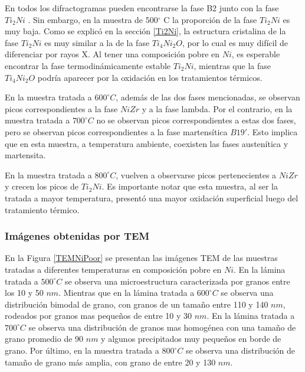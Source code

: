 \documentclass[12pt]{article}
\theoremstyle{definition}
\theoremstyle{remark}
\begin{document}
{En todos los difractogramas pueden encontrarse la fase B2 junto con la fase $Ti_2Ni$ . Sin embargo, en la muestra de 500$^\circ$ C la proporción de la fase $Ti_2 Ni$ es muy baja. Como se explicó en la sección \ref{Ti2Ni}, la estructura cristalina de la fase $Ti_2 Ni$ es muy similar a la de la fase $Ti_4Ni_2O$, por lo cual es muy difícil de diferenciar por rayos X. Al tener una composición pobre en $Ni$, es esperable encontrar la fase termodinámicamente estable $Ti_2 Ni$, mientras que la fase $Ti_4Ni_2O$ podría aparecer por la oxidación en los tratamientos térmicos.

En la muestra tratada a $600 ^\circ C$, además de las dos fases mencionadas, se observan picos correspondientes a la fase $NiZr$ y a la fase lambda. Por el contrario, en la muestra tratada a $700 ^\circ C$ no se observan picos correspondientes a estas dos fases, pero se observan picos correspondientes a la fase martensítica $B19'$. Esto implica que en esta muestra, a temperatura ambiente, coexisten las fases austenítica y martensita.

En la muestra tratada a $800 ^\circ C$, vuelven a observarse picos pertenecientes a $NiZr$ y crecen los picos de $Ti_2 Ni$. Es importante notar que esta muestra, al ser la tratada a mayor temperatura, presentó una mayor oxidación superficial luego del tratamiento térmico. 


\subsubsection{Imágenes obtenidas por TEM}
\label{TemNiPoorResults}

En la Figura \ref{TEMNiPoor} se presentan las imágenes TEM de las muestras tratadas a diferentes temperaturas en composición pobre en $Ni$. En la lámina tratada a $500 ^\circ C$ se observa una microestructura caracterizada por granos entre los 10 y 50 $nm$. Mientras que en la lámina tratada a $600 ^\circ C$ se observa una distribución bimodal de grano, con granos de un tamaño entre 110 y 140 $nm$, rodeados por granos mas pequeños de entre 10 y 30 $nm$. En la lámina tratada a $700 ^\circ C$ se observa una distribución de granos mas homogénea con una tamaño de grano promedio de 90 $nm$ y algunos precipitados muy pequeños en borde de grano. Por último, en la muestra tratada a $800 ^\circ C$ se observa una distribución de tamaño de grano más amplia, con grano de entre 20 y 130 $nm$.

}
\end{document}
